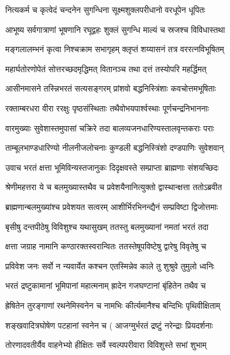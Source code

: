 \twolineshloka
{नित्यकर्म च कृत्वेदं चन्दनेन सुगन्धिना}
{सूक्ष्मशुक्लपरीधानो वरधूपेन धूपितः}%

\twolineshloka
{आभूष्य सर्वगात्राणां भूषणानि रघूद्वहः}
{शुक्लं सुगन्धि माल्यं च स्रजश्च विविधास्तथा}%

\twolineshloka
{मङ्गलालम्भनं कृत्वा निश्चक्राम सभागृहम्}
{क्लृप्तं शय्यासनं तत्र वररत्नविभूषितम्}%

\twolineshloka
{महार्घतोरणोपेतं सोत्तरच्छदमृद्धिमत्}
{वितानञ्च तथा दत्तं तस्योपरि महर्द्धिमत्}%

\twolineshloka
{आसीनमासने तस्न्निभरतं सत्यसङ्गरम्}
{प्रांशवो बद्धनिस्त्रिंशाः कवचोत्तमभूषिताः}%

\twolineshloka
{रक्ताम्बरधरा वीरा ररक्षुः पृष्ठसंस्थिताः}
{तथैवोभयपार्श्वस्थाः पूर्णचन्द्रनिभाननाः}%

\twolineshloka
{वारमुख्याः सुवेशास्तमुपासां चक्रिरे तदा}
{बालव्यजनधारिण्यस्तालवृन्तकराः पराः}%

\twolineshloka
{ताम्बूलभाण्डधारिण्यो नीलनीजलोचनाः}
{कुण्डली बद्धनिस्त्रिंशो दण्डपाणिः सुवेशवान्} %

\twolineshloka
{उवाच भरतं क्षत्ता भूमिविन्यस्तजानुकः}
{दिदृक्षवस्ते सम्प्राप्ता ब्राह्मणाः संशयच्छिदः}%

\twolineshloka
{श्रेणीमहत्तरा ये च बलमुख्यास्तथैव च}
{प्रवेशयैनानित्युक्तो द्वास्थान्क्षत्ता ततोऽब्रवीत}%

\twolineshloka
{ब्राह्मणान्बलमुख्यांश्च प्रवेशयत सत्वरम्}
{आशीर्भिरभिनन्द्यैनं सम्प्रविष्टा द्विजोत्तमाः}%

\twolineshloka
{बृसीषु दन्तपीठेषु विविशुश्च यथासुखम्}
{ततस्तु बलमुख्यानां नमतां भरतं तदा}%

\twolineshloka
{क्षत्ता जग्राह नामानि कण्ठारक्तस्वरान्वितः}
{ततस्तेषूपविष्टेषु द्वारेषु विवृतेषु च}%

\twolineshloka
{प्रविवेश जनः सर्वो न न्यवार्येत कश्चन}
{एतस्मिन्नेव काले तु शुश्रुवे तुमुलो ध्वनिः}%

\twolineshloka
{भरतं द्रष्टुकामानां भूमिपानां महात्मनाम्}
{ह्रादेन गजघण्टानां बृंहितेन तथैव च}%

\twolineshloka
{ह्रेषितेन तुरङ्गाणां रथनेमिस्वनेन च}
{नामभिः कीर्त्यमानैश्च बन्दिभिः पृथिवीक्षिताम्}%

\twolineshloka
{शङ्खवादित्रघोषेण पटहानां स्वनेन च}
{( आजग्मुर्भरतं द्रष्टुं नरेन्द्राः प्रियदर्शनाः}%

\twolineshloka
{तोरणादवतीर्यैव वाहनेभ्यो हीक्षितः}
{सर्वे स्वल्पपरीवारा विविशुस्ते सभां शुभाम्} %

